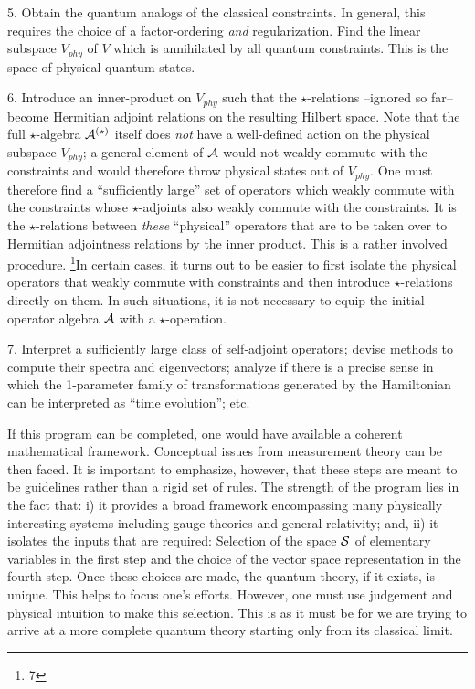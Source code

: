 \item{5.} Obtain the quantum analogs of the classical constraints. In general,
this requires the choice of a factor-ordering {\it and} regularization. Find
the linear subspace $V_{phy}$ of $V$ which is annihilated by all quantum
constraints. This is the space of physical quantum states.
\item{6.} Introduce an inner-product on $V_{phy}$ such that the
$\star$-relations --ignored so far-- become Hermitian adjoint relations on
the resulting Hilbert space. Note that the full $\star$-algebra
${\cal A}^{(\star)}$ itself does {\it not} have a well-defined action on the
physical subspace $V_{phy}$; a general element of ${\cal A}$ would not weakly
commute with the constraints and would therefore throw physical states out
of $V_{phy}$. One must therefore find a ``sufficiently large'' set of
operators which weakly commute with the constraints whose $\star$-adjoints
also weakly commute with the constraints. It is the $\star$-relations between
{\it these} ``physical'' operators that are to be taken over to Hermitian
adjointness relations by the inner product. This is a rather involved
procedure.
\footnote{7}{In certain cases, it turns out to be easier to first isolate
the physical operators that weakly commute with constraints and then
introduce $\star$-relations directly on them. In such situations, it is
not necessary to equip the initial operator algebra ${\cal A}$ with a
$\star$-operation.}
\item{7.} Interpret a sufficiently large class of self-adjoint operators;
devise methods to compute their spectra and eigenvectors; analyze if there is
a precise sense in which the 1-parameter family of transformations generated
by the Hamiltonian can be interpreted as ``time evolution''; etc.

If this program can be completed, one would have available a coherent
mathematical framework. Conceptual issues from measurement theory can
be then faced. It is important to emphasize, however, that these steps
are meant to be guidelines rather than a rigid set of rules. The strength
of the program lies in the fact that: i) it provides a broad framework
encompassing many physically interesting systems including gauge theories and
general relativity; and, ii) it isolates the inputs that are required:
Selection of the space ${\cal S}$ of elementary variables in the first step
and the choice of the vector space representation in the fourth step. Once
these choices are made, the quantum theory, if it exists, is unique. This
helps to focus one's efforts. However, one must use judgement and physical
intuition to make this selection. This is as it must be for we are trying
to arrive at a more complete quantum theory starting only from its classical
limit.

